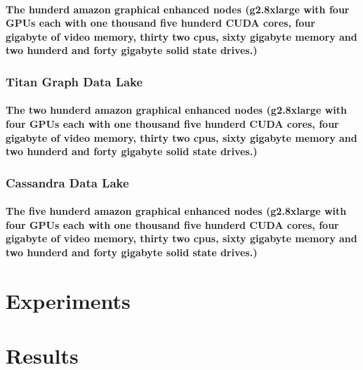 \documentclass{acm_proc_article-sp}
\begin{document}
\paragraph{The hunderd amazon graphical enhanced nodes (g2.8xlarge with four GPUs each with one thousand five hunderd CUDA cores, four gigabyte of video memory, thirty two cpus, sixty gigabyte memory and two hunderd and forty gigabyte solid state drives.)}
\subsubsection{Titan Graph Data Lake}
\paragraph{The two hunderd amazon graphical enhanced nodes (g2.8xlarge with four GPUs each with one thousand five hunderd CUDA cores, four gigabyte of video memory, thirty two cpus, sixty gigabyte memory and two hunderd and forty gigabyte solid state drives.)}\subsubsection{Cassandra Data Lake}
\paragraph{The five hunderd amazon graphical enhanced nodes (g2.8xlarge with four GPUs each with one thousand five hunderd CUDA cores, four gigabyte of video memory, thirty two cpus, sixty gigabyte memory and two hunderd and forty gigabyte solid state drives.)}
\newpage
\section{Experiments}
\section{Results}
\newpage


\end{document}

